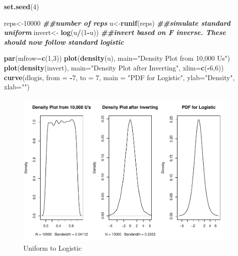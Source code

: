\documentclass[
]{book}
\newenvironment{Shaded}{\begin{snugshade}}{\end{snugshade}}
\newcommand{\AttributeTok}[1]{\textcolor[rgb]{0.13,0.29,0.53}{#1}}
\newcommand{\DecValTok}[1]{\textcolor[rgb]{0.00,0.00,0.81}{#1}}
\newcommand{\DocumentationTok}[1]{\textcolor[rgb]{0.56,0.35,0.01}{\textbf{\textit{#1}}}}
\newcommand{\FunctionTok}[1]{\textcolor[rgb]{0.13,0.29,0.53}{\textbf{#1}}}
\newcommand{\NormalTok}[1]{#1}
\newcommand{\OtherTok}[1]{\textcolor[rgb]{0.56,0.35,0.01}{#1}}
\newcommand{\SpecialCharTok}[1]{\textcolor[rgb]{0.81,0.36,0.00}{\textbf{#1}}}
\newcommand{\StringTok}[1]{\textcolor[rgb]{0.31,0.60,0.02}{#1}}
\begin{document}
\begin{Shaded}
\begin{Highlighting}[]
\FunctionTok{set.seed}\NormalTok{(}\DecValTok{4}\NormalTok{)}

\NormalTok{reps}\OtherTok{\textless{}{-}}\DecValTok{10000} \DocumentationTok{\#\#number of reps}
\NormalTok{u}\OtherTok{\textless{}{-}}\FunctionTok{runif}\NormalTok{(reps) }\DocumentationTok{\#\#simulate standard uniform}
\NormalTok{invert}\OtherTok{\textless{}{-}} \FunctionTok{log}\NormalTok{(u}\SpecialCharTok{/}\NormalTok{(}\DecValTok{1}\SpecialCharTok{{-}}\NormalTok{u)) }\DocumentationTok{\#\#invert based on F inverse. These should now follow standard logistic}

\FunctionTok{par}\NormalTok{(}\AttributeTok{mfrow=}\FunctionTok{c}\NormalTok{(}\DecValTok{1}\NormalTok{,}\DecValTok{3}\NormalTok{))}
\FunctionTok{plot}\NormalTok{(}\FunctionTok{density}\NormalTok{(u), }\AttributeTok{main=}\StringTok{"Density Plot from 10,000 U\textquotesingle{}s"}\NormalTok{)}
\FunctionTok{plot}\NormalTok{(}\FunctionTok{density}\NormalTok{(invert), }\AttributeTok{main=}\StringTok{"Density Plot after Inverting"}\NormalTok{, }\AttributeTok{xlim=}\FunctionTok{c}\NormalTok{(}\SpecialCharTok{{-}}\DecValTok{6}\NormalTok{,}\DecValTok{6}\NormalTok{))}
\FunctionTok{curve}\NormalTok{(dlogis, }\AttributeTok{from =} \SpecialCharTok{{-}}\DecValTok{7}\NormalTok{, }\AttributeTok{to =} \DecValTok{7}\NormalTok{, }\AttributeTok{main =} \StringTok{"PDF for Logistic"}\NormalTok{, }\AttributeTok{ylab=}\StringTok{"Density"}\NormalTok{, }\AttributeTok{xlab=}\StringTok{""}\NormalTok{)}
\end{Highlighting}
\end{Shaded}

\begin{figure}
\centering
\includegraphics{bookdown-demo_files/figure-latex/4-universe-1.pdf}
\caption{\label{fig:4-universe}Uniform to Logistic}
\end{figure}
\end{document}
